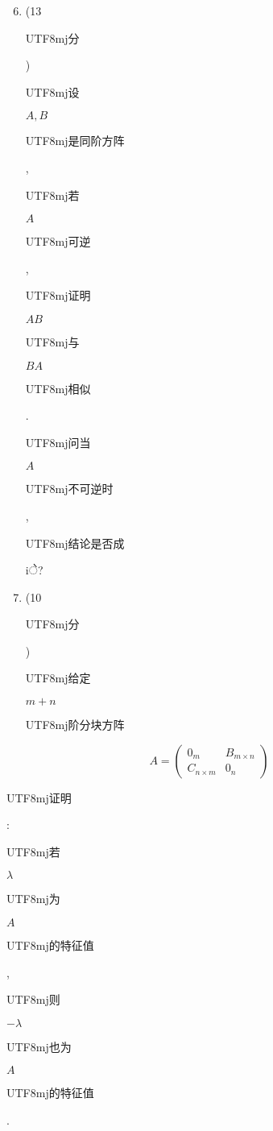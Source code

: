 \documentclass[10pt]{article}
\begin{document}
\begin{enumerate}
  \setcounter{enumi}{5}
  \item (13 \begin{CJK}{UTF8}{mj}分\end{CJK}) \begin{CJK}{UTF8}{mj}设\end{CJK} $A, B$ \begin{CJK}{UTF8}{mj}是同阶方阵\end{CJK}, \begin{CJK}{UTF8}{mj}若\end{CJK} $A$ \begin{CJK}{UTF8}{mj}可逆\end{CJK}, \begin{CJK}{UTF8}{mj}证明\end{CJK} $A B$ \begin{CJK}{UTF8}{mj}与\end{CJK} $B A$ \begin{CJK}{UTF8}{mj}相似\end{CJK}. \begin{CJK}{UTF8}{mj}问当\end{CJK} $A$ \begin{CJK}{UTF8}{mj}不可逆时\end{CJK},\begin{CJK}{UTF8}{mj}结论是否成\end{CJK} iे?

  \item (10 \begin{CJK}{UTF8}{mj}分\end{CJK}) \begin{CJK}{UTF8}{mj}给定\end{CJK} $m+n$ \begin{CJK}{UTF8}{mj}阶分块方阵\end{CJK}

\end{enumerate}
$$
A=\left(\begin{array}{cc}
0_{m} & B_{m \times n} \\
C_{n \times m} & 0_{n}
\end{array}\right)
$$
\begin{CJK}{UTF8}{mj}证明\end{CJK}: \begin{CJK}{UTF8}{mj}若\end{CJK} $\lambda$ \begin{CJK}{UTF8}{mj}为\end{CJK} $A$ \begin{CJK}{UTF8}{mj}的特征值\end{CJK}, \begin{CJK}{UTF8}{mj}则\end{CJK} $-\lambda$ \begin{CJK}{UTF8}{mj}也为\end{CJK} $A$ \begin{CJK}{UTF8}{mj}的特征值\end{CJK}.
\end{document}

